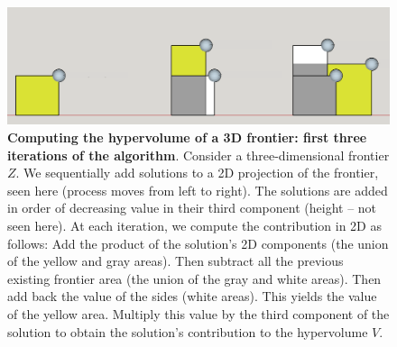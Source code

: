 \begin{figure}[ht]
\centering
\caption[First iterations for computing $\overbar{V}$]{\textbf{Computing the hypervolume of a 3D frontier: first three iterations of the algorithm}. Consider a three-dimensional frontier $Z$. We sequentially add solutions to a 2D projection of the frontier, seen here (process moves from left to right). The solutions are added in order of decreasing value in their third component (height -- not seen here). At each iteration, we compute the contribution in 2D as follows: Add the product of the solution's 2D components (the union of the yellow and gray areas). Then subtract all the previous existing frontier area (the union of the gray and white areas). Then add back the value of the sides (white areas). This yields the value of the yellow area. Multiply this value by the third component of the solution to obtain the solution's contribution to the hypervolume $V$.}
\label{fig:AlgoAid}
\includegraphics[width=.85\textwidth]{../images/3DFrontierSchematic_SketchUp_FirstSteps_2D_clean}
\end{figure}

